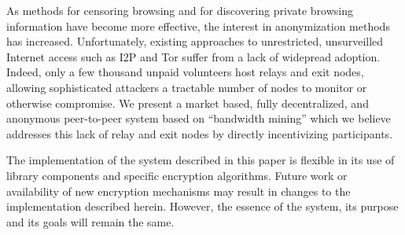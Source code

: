 
\noindent
As methods for censoring browsing and for discovering private browsing information have become more effective, the interest in anonymization methods has increased. Unfortunately, existing approaches to unrestricted, unsurveilled Internet access such as I2P and Tor suffer from a lack of widepread adoption.  Indeed,  only a few thousand unpaid volunteers host relays and exit nodes, allowing sophisticated attackers a tractable number of nodes to monitor or otherwise compromise. We present a market based, fully decentralized, and anonymous peer-to-peer system based on “bandwidth mining” which we believe addresses this lack of relay and exit nodes by directly incentivizing participants.

\noindent
The implementation of the system described in this paper is flexible in its use of library components and specific encryption algorithms.  Future work or availability of new encryption mechanisms may result in changes to the implementation described herein.  However, the essence of the system, its purpose and its goals will remain the same.

